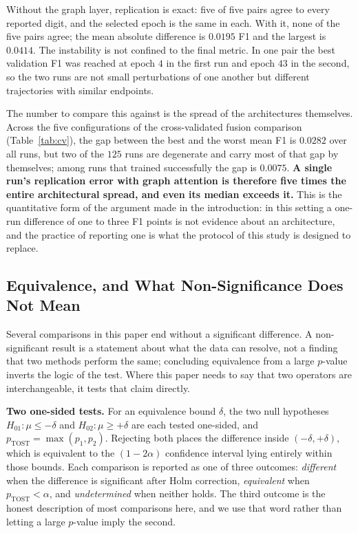 \documentclass[journal]{IEEEtran}
\begin{document}
Without the graph layer, replication is exact: five of five pairs agree to
every reported digit, and the selected epoch is the same in each. With it,
none of the five pairs agree; the mean absolute difference is $0.0195$ F1 and
the largest is $0.0414$. The instability is not confined to the final metric.
In one pair the best validation F1 was reached at epoch $4$ in the first run
and epoch $43$ in the second, so the two runs are not small perturbations of
one another but different trajectories with similar endpoints.

The number to compare this against is the spread of the architectures
themselves. Across the five configurations of the cross-validated fusion
comparison (Table~\ref{tab:cv}), the gap between the best and the worst mean
F1 is $0.0282$ over all runs, but two of the $125$ runs are degenerate and
carry most of that gap by themselves; among runs that trained successfully the
gap is $0.0075$. \textbf{A single run's replication error with graph attention
is therefore five times the entire architectural spread, and even its median
exceeds it.} This is the quantitative form of the argument made in
the introduction: in this setting a one-run difference of one to three F1
points is not evidence about an architecture, and the practice of reporting
one is what the protocol of this study is designed to replace.

\subsection{Equivalence, and What Non-Significance Does Not Mean}
\label{sec:equivalence}
Several comparisons in this paper end without a significant difference. A
non-significant result is a statement about what the data can resolve, not a
finding that two methods perform the same; concluding equivalence from a large
$p$-value inverts the logic of the test. Where this paper needs to say that
two operators are interchangeable, it tests that claim directly.

\textbf{Two one-sided tests.} For an equivalence bound $\delta$, the two null
hypotheses $H_{01}: \mu \le -\delta$ and $H_{02}: \mu \ge +\delta$ are each
tested one-sided, and $p_{\mathrm{TOST}} = \max(p_1, p_2)$. Rejecting both
places the difference inside $(-\delta, +\delta)$, which is equivalent to the
$(1-2\alpha)$ confidence interval lying entirely within those bounds. Each
comparison is reported as one of three outcomes: \emph{different} when the
difference is significant after Holm correction, \emph{equivalent} when
$p_{\mathrm{TOST}} < \alpha$, and \emph{undetermined} when neither holds. The
third outcome is the honest description of most comparisons here, and we use
that word rather than letting a large $p$-value imply the second.
\end{document}
